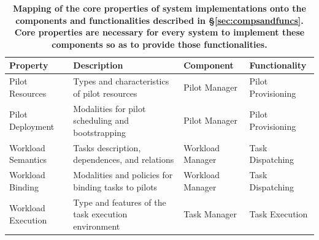 \documentclass{sig-alternate}
\begin{document}
\begin{table}
\centering
\begin{tabular}{p{3cm}p{7.7cm}p{2.7cm}p{2.6cm}}

\toprule

\textbf{Property} &
\textbf{Description} &
\textbf{Component} &
\textbf{Functionality} \\

\midrule

Pilot Resources &
Types and characteristics of pilot resources &
Pilot Manager &
Pilot Provisioning \\

Pilot Deployment &
Modalities for pilot scheduling and bootstrapping &
Pilot Manager &
Pilot Provisioning \\

Workload Semantics &
Tasks description, dependences, and relations &
Workload Manager &
Task Dispatching \\

Workload Binding&
Modalities and policies for binding tasks to pilots &
Workload Manager&
Task Dispatching \\

Workload Execution &
Type and features of the task execution environment &
Task Manager &
Task Execution \\

\bottomrule

\end{tabular}
\caption{\textbf{Mapping of the core properties  of \pilot system
  implementations onto the components and functionalities described in
  \S\ref{sec:compsandfuncs}. Core properties are necessary for every \pilot
  system to implement these components so as to provide those functionalities.}
  }
\label{table:core_properties}
\end{table}
\end{document}
